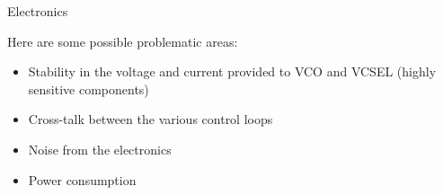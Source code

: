 \begin{frame}{Electronics}

    Here are some possible problematic areas:

    \begin{itemize}
        \item Stability in the voltage and current provided to VCO and VCSEL (highly sensitive components)
        \item Cross-talk between the various control loops
        \item Noise from the electronics
        \item Power consumption
    \end{itemize}

\end{frame}